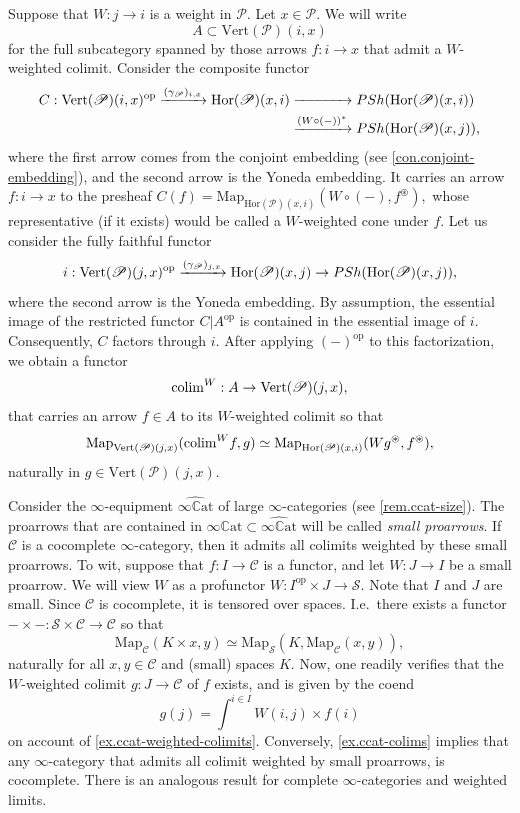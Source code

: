 \documentclass[a4paper, 11pt]{amsart}
\numberwithin{theorem}{section}
\theoremstyle{definition}
\newcommand{\cat}[1]{\textup{#1}}
\newcommand{\op}{\mathrm{op}}
\newcommand{\map}{\mathrm{Map}}
\def\colim{\qopname\relax m{colim}}
\renewcommand{\S}{\mathscr{S}}
\newcommand{\C}{\mathscr{C}}
\renewcommand{\P}{\mathscr{P}}
\renewcommand{\Vert}{\mathrm{Vert}}
\newcommand{\Hor}{\mathrm{Hor}}
\newcommand{\PSh}{\cat{PSh}}
\newcommand{\CCAT}{\mathbb{C}\mathrm{at}}
\begin{document}
\begin{construction}\label{con.colim-functor}
	Suppose that $W : j \rightarrow i$ is a weight in $\P$. Let $x \in \P$. We will write $$A \subset \Vert(\P)(i,x)$$ for the full subcategory spanned by those arrows $f : i \rightarrow x$ 
	that admit a $W$-weighted colimit. Consider the composite functor
	\begin{align*}
	C : \Vert(\P)(i,x)^\op \xrightarrow{(\gamma_\P)_{i,x}} \Hor(\P)(x,i) &\xrightarrow{\phantom{(W \circ (-) )^*}} \cat{PSh}(\Hor(\P)(x,i)) \\
	&\xrightarrow{(W \circ (-) )^*} \cat{PSh}(\Hor(\P)(x,j)),
	\end{align*}
	where the first arrow comes from the conjoint embedding (see \cref{con.conjoint-embedding}), and the second arrow is the Yoneda embedding.
	It carries an arrow $f : i \rightarrow x$ to the presheaf 
	$
	C(f) = \map_{\Hor(\P)(x,i)}(W \circ (-) , f^\circledast),
	$
	whose representative (if it exists) would be called a $W$-weighted cone under $f$.
	Let us consider the fully faithful functor
	$$
	i : \Vert(\P)(j,x)^\op \xrightarrow{(\gamma_\P)_{j,x}} \Hor(\P)(x,j) \rightarrow \PSh(\Hor(\P)(x,j)),
	$$
	where the second arrow is the Yoneda embedding. By assumption, the essential image of the restricted functor $C|A^\op$ is contained in the essential image of $i$. 
	Consequently, $C$ factors through $i$. After applying $(-)^\op$ to this factorization, we obtain a functor
	$$
	{\colim}^W: A \rightarrow \Vert(\P)(j,x),
	$$
	that carries an arrow $f \in A$ to its $W$-weighted colimit so that
	$$
	\map_{\Vert(\P)(j,x)}({\colim}^W f, g) \simeq \map_{\Hor(\P)(x,i)}(W g^\circledast , f^\circledast),
	$$
	naturally in $g \in \Vert(\P)(j,x)$.
\end{construction}


\begin{example}\label{ex.ccat-weighted-colimits-2}
	Consider the $\infty$-equipment $\widehat{\infty\CCAT}$ of large $\infty$-categories (see \cref{rem.ccat-size}). The proarrows that are contained in $\infty\CCAT \subset \widehat{\infty\CCAT}$ will be called 
	\textit{small proarrows}.
	If $\C$ is a cocomplete $\infty$-category, then it admits all colimits 
	weighted by these small proarrows. To wit, suppose that $f : I \rightarrow \C$ is a functor, and let $W : J \rightarrow I$ be a small proarrow. 
	We will view $W$ as a profunctor $W : I^\op \times J \rightarrow \S$. Note that $I$ and $J$ are small. Since $\C$ is cocomplete, 
	it is tensored over spaces. I.e.\ there exists a functor 
	$
	- \times - : \S \times \C \rightarrow \C 
	$
	so that $$\map_\C(K \times x, y) \simeq \map_\S(K, \map_\C(x,y)),$$ naturally for all $x,y \in \C$ and (small) spaces $K$. Now, one readily verifies 
	that the $W$-weighted colimit $g : J \rightarrow \C$ of $f$ exists, and is given by the coend 
	$$
	g(j) = \int^{i \in I}W(i,j) \times f(i)
	$$ 
	on account of \cref{ex.ccat-weighted-colimits}.
	Conversely, \cref{ex.ccat-colims} implies that any $\infty$-category that admits all colimit weighted by small proarrows, is cocomplete. There is an analogous result for complete $\infty$-categories and weighted limits.
\end{example}
\end{document}
